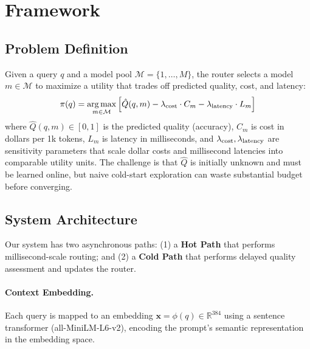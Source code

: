 
\section{Framework}
\label{sec:method}

\subsection{Problem Definition}
\label{sec:problem}

Given a query $q$ and a model pool $\mathcal{M}=\{1,\ldots,M\}$, the router selects a model $m\in\mathcal{M}$ to maximize a utility that trades off predicted quality, cost, and latency:
\begin{equation}
\pi(q) = \operatorname*{arg\,max}_{m \in \mathcal{M}} \left[ \hat{Q}(q, m) - \lambda_{\text{cost}} \cdot C_m - \lambda_{\text{latency}} \cdot L_m \right]
\label{eq:utility}
\end{equation}
where $\hat{Q}(q, m) \in [0,1]$ is the predicted quality (accuracy), $C_m$ is cost in dollars per 1k tokens, $L_m$ is latency in milliseconds, and $\lambda_{\text{cost}},\lambda_{\text{latency}}$ are sensitivity parameters that scale dollar costs and millisecond latencies into comparable utility units. The challenge is that $\hat{Q}$ is initially unknown and must be learned online, but naive cold-start exploration can waste substantial budget before converging.

\subsection{System Architecture}
\label{sec:architecture}

Our system has two asynchronous paths: (1) a \textbf{Hot Path} that performs millisecond-scale routing; and (2) a \textbf{Cold Path} that performs delayed quality assessment and updates the router.

\paragraph{Context Embedding.} Each query is mapped to an embedding $\mathbf{x}=\phi(q)\in\mathbb{R}^{384}$ using a sentence transformer (all-MiniLM-L6-v2), encoding the prompt's semantic representation in the embedding space.

